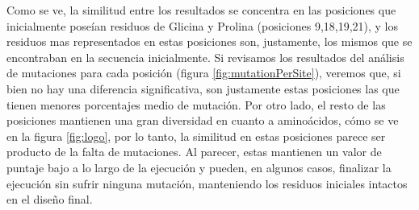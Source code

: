Como se ve, la similitud entre los resultados se concentra en las posiciones que inicialmente  
poseían residuos de Glicina y Prolina (posiciones 9,18,19,21), y los residuos mas representados en estas posiciones son, justamente, los mismos que se encontraban en la secuencia inicialmente. 
Si revisamos los resultados del análisis de mutaciones para cada posición (figura \ref{fig:mutationPerSite}), veremos que, si bien no hay una diferencia significativa, 
son justamente estas posiciones las que tienen menores porcentajes medio de mutación.
Por otro lado, el resto de las posiciones mantienen una gran diversidad en cuanto a aminoácidos, cómo se ve en la figura \ref{fig:logo},
por lo tanto, la similitud en estas posiciones parece ser producto de la falta de mutaciones.
Al parecer, estas mantienen un valor de puntaje bajo a lo largo de la ejecución y pueden, en algunos casos, finalizar la ejecución sin sufrir ninguna mutación, manteniendo los residuos iniciales intactos en el diseño final.





